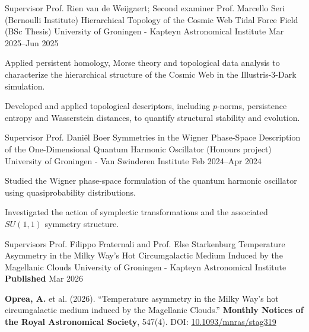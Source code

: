 \begin{cventries}
  \cventry
  {Supervisor Prof. Rien van de Weijgaert; Second examiner Prof. Marcello Seri (Bernoulli Institute)} %
  {Hierarchical Topology of the Cosmic Web Tidal Force Field (BSc Thesis)} %
  {University of Groningen - Kapteyn Astronomical Institute} %
  {Mar 2025--Jun 2025} %
  {
    \begin{cvitems} %
      \item {Applied persistent homology, Morse theory and topological data analysis to characterize the hierarchical structure of the Cosmic Web in the Illustris-3-Dark simulation.}
      \item {Developed and applied topological descriptors, including $p$-norms, persistence entropy and Wasserstein distances, to quantify structural stability and evolution.}
    \end{cvitems}
  }

  \cventry
  {Supervisor Prof. Daniël Boer} %
  {Symmetries in the Wigner Phase-Space Description of the One-Dimensional Quantum Harmonic Oscillator (Honours project)} %
  {University of Groningen - Van Swinderen Institute} %
  {Feb 2024--Apr 2024} %
  {
    \begin{cvitems} %
      \item {Studied the Wigner phase-space formulation of the quantum harmonic oscillator using quasiprobability distributions.}
      \item {Investigated the action of symplectic transformations and the associated $SU(1,1)$ symmetry structure.}
    \end{cvitems}
  }
\end{cventries}
\newpage
{}
\begin{cventries}
  \cventry
  {Supervisors Prof. Filippo Fraternali and Prof. Else Starkenburg} %
  {Temperature Asymmetry in the Milky Way's Hot Circumgalactic Medium Induced by the Magellanic Clouds} %
  {University of Groningen - Kapteyn Astronomical Institute} %
  {\textbf{Published} Mar 2026} %
  {
    \begin{cvitems} %
      \item{\textbf{Oprea, A.} et al. (2026).
                  ``Temperature asymmetry in the Milky Way's hot circumgalactic medium induced by the Magellanic Clouds.''
                  \textbf{Monthly Notices of the Royal Astronomical Society}, 547(4).
                  DOI: \href{https://doi.org/10.1093/mnras/stag319}{10.1093/mnras/stag319}}
    \end{cvitems}
  }
\end{cventries}
